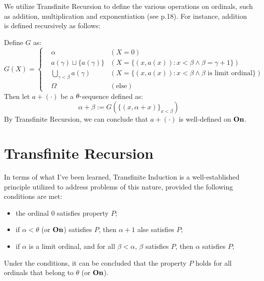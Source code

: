 We utilize Transfinite Recursion to define the various operations on ordinals, such as addition, multiplication and exponentiation (see \cite{LWW_AJM} p.18). For instance, addition is defined recursively as follows:

Define $G$ as:
\[
  G(X) = 
  \left\{
    \begin{aligned}
      & \alpha  & (X = 0)  \\
      & a(\gamma) \sqcup \{ a(\gamma) \}  & \left( X = \{ (x, a(x)): x < \beta \land \beta = \gamma + 1 \} \right) \\
      & \bigcup_{\gamma < \beta} a(\gamma)  & \left( X = \{ (x, a(x)): x < \beta \land \beta \text{ is limit ordinal} \} \right) \\
      & \Omega  & (\text{else})
    \end{aligned} 
  \right.
\]
Then let $a + (\cdot)$ be a $\theta\mbox{-}$sequence defined as:
\[
    \alpha + \beta := G(\{ (x, \alpha + x) \}_{x < \beta})
\]
By Transfinite Recursion, we can conclude that $a + (\cdot)$ is well-defined on $\boldsymbol{\mathrm{On}}$.





\section{Transfinite Recursion}


In terms of what I've been learned, 
Transfinite Induction is a well-established principle utilized to address problems of this nature, provided the following conditions are met:
\begin{itemize}
  \item the ordinal $0$ satisfies property $P$;
  \item if $\alpha < \theta$ (or $\boldsymbol{\mathrm{On}}$) satisfies $P$, then $\alpha + 1$ alse satisfies $P$;
  \item if $\alpha$ is a limit ordinal, and for all $\beta < \alpha$, $\beta$ satisfies $P$, then $\alpha$ satisfies $P$;
\end{itemize}
Under the conditions, it can be concluded that the property $P$ holds for all ordinals that belong to $\theta$ (or $\boldsymbol{\mathrm{On}}$).


